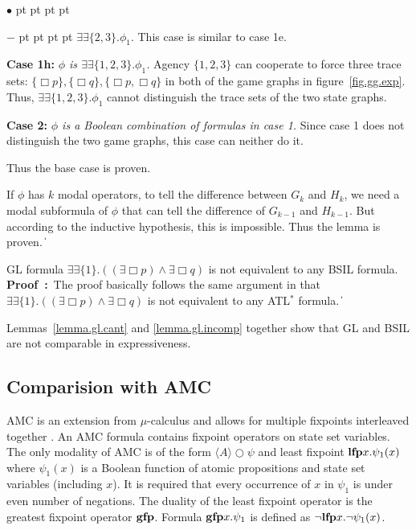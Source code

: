 \documentclass[11pt]{article}
\newcommand{\existsb}{\mbox{$\exists\!\!\exists$}}
\newcommand{\emgfp}{\mbox{\bf gfp}}
\newcommand{\emlfp}{\mbox{\bf lfp}}
\newcommand{\pf}{\noindent\mbox{\bf Proof : }}
\newcommand{\pfrr}{\Box}
\newcommand{\nxt}{\bigcirc}
\def\qed{\ifmmode\|\else{\unskip\nobreak\hfil
\penalty50\hskip1em\null\nobreak\hfil$\blacksquare$
\parfillskip=0pt\finalhyphendemerits=0\endgraf}\fi}
\newenvironment{list1}{\begin{list}{$\bullet$}
{\topsep 0 pt \parsep 0 pt \partopsep 0 pt \itemsep 0 pt}}{\end{list}}
\newenvironment{list2}{\begin{list}{$-$}
{\topsep 0 pt \parsep 0 pt \partopsep 0 pt \itemsep 0 pt}}{\end{list}}
\begin{document}
\begin{list1}
\begin{list2}
{        $\existsb\{2,3\}.\phi_1$.}
        This case is similar to case 1e.
    \item {\bf Case 1h:} {\em $\phi$ is
        $\existsb\{1,2,3\}.\phi_1$.}
        Agency $\{1, 2,3\}$ can cooperate to force three trace sets:
        $\{\pfrr p\}, \{\pfrr q\}, \{\pfrr p,\pfrr q\}$
        in both of the game graphs in figure~\ref{fig.gg.exp}.
        Thus, $\existsb\{1,2,3\}.\phi_1$ cannot distinguish the trace sets of the
        two state graphs.
    \end{list2}
\item {\bf Case 2:} {\em $\phi$ is a Boolean combination of
    formulas in case 1.}
    Since case 1 does not distinguish the two game graphs, 
    this case can neither do it.  
\end{list1}
Thus the base case is proven.

If $\phi$ has $k$ modal operators,
to tell the difference between $G_k$ and $H_k$,
we need a modal subformula of $\phi$ that can tell the difference
of $G_{k-1}$ and $H_{k-1}$.
But according to the inductive hypothesis, this is impossible.
Thus the lemma is proven.  
\qed 



{\lemma \label{lemma.gl.incomp}
GL formula $\existsb\{1\}.((\exists\pfrr p)\wedge\exists\pfrr q)$
is not equivalent to any BSIL formula.
}
\\\pf The proof basically follows the same argument in \cite{AHK02} 
that $\existsb\{1\}.((\exists\pfrr p)\wedge\exists\pfrr q)$ 
is not equivalent to 
any ATL$^*$ formula.  
\qed 

Lemmas~\ref{lemma.gl.cant} and 
\ref{lemma.gl.incomp} together show that 
GL and BSIL are not comparable in expressiveness.  






\subsection{Comparision with AMC\label{subsec.exp.amc}} 

AMC is an extension from $\mu$-calculus and allows 
for multiple fixpoints interleaved together \cite{AHK02}.  
An AMC formula contains fixpoint operators on state set variables.  
The only modality of AMC is of the form $\langle A\rangle\nxt\psi$ 
and least fixpoint $\emlfp x.\psi_1(x)$ where 
$\psi_1(x)$ is a Boolean function of atomic propositions 
and state set variables (including $x$).  
It is required that every occurrence of $x$ in $\psi_1$ is 
under even number of negations.  
The duality of the least fixpoint operator is the greatest fixpoint 
operator $\emgfp$.  
Formula $\emgfp x.\psi_1$ is defined as $\neg\emlfp x.\neg\psi_1(x)$.  
\end{document}

